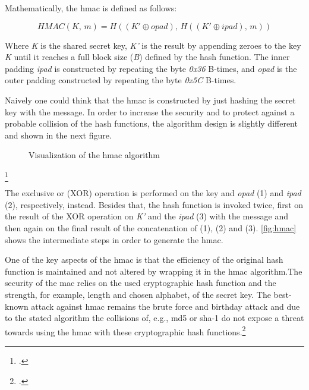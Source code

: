 Mathematically, the \gls{hmac} is defined as follows:

\begin{equation*}
	HMAC(K,\, m) = H((K' \oplus opad),\, H((K' \oplus ipad),\, m))
\end{equation*}

Where \textit{K} is the shared secret key, \textit{K'} is the result by appending zeroes to the key \textit{K} until it reaches a full block size (\textit{B}) defined by the hash function. The inner padding \textit{ipad} is constructed by repeating the byte \textit{0x36} B-times, and \textit{opad} is the outer padding constructed by repeating the byte \textit{0x5C} B-times.

Naively one could think that the \gls{hmac} is constructed by just hashing the secret key with the message. In order to increase the security and to protect against a probable collision of the hash functions, the algorithm design is slightly different and shown in the next figure.

\begin{figure}[hbt]
	\centering
	
	\caption[Visualization of the \gls{hmac} algorithm]{Visualization of the \gls{hmac} algorithm\footnotemark}
	\label{fig:hmac}
\end{figure}
\footcitetext[Source: diagram by author, based on][395]{eckert-it-sec-9}

The exclusive or (XOR) operation is performed on the key and \textit{opad} (1) and \textit{ipad} (2), respectively, instead. Besides that, the hash function is invoked twice, first on the result of the XOR operation on \textit{K'} and the \textit{ipad} (3) with the message and then again on the final result of the concatenation of (1), (2) and (3). \autoref{fig:hmac} shows the intermediate steps in order to generate the \gls{hmac}.

One of the key aspects of the \gls{hmac} is that the efficiency of the original hash function is maintained and not altered by wrapping it in the \gls{hmac} algorithm.The security of the \gls{mac} relies on the used cryptographic hash function and the strength, for example, length and chosen alphabet, of the secret key. The best-known attack against \gls{hmac} remains the brute force and birthday attack and due to the stated algorithm the collisions of, e.g., \gls{md}5 or \gls{sha}-1 do not expose a threat towards using the \gls{hmac} with these cryptographic hash functions.\footcites[See][Chapter 10.4.1]{2308830}[See][398]{1679747}[See][3, 10--13]{10.1007/3-540-68697-5_1}[See][]{10.1007/3-540-44750-4_1}

